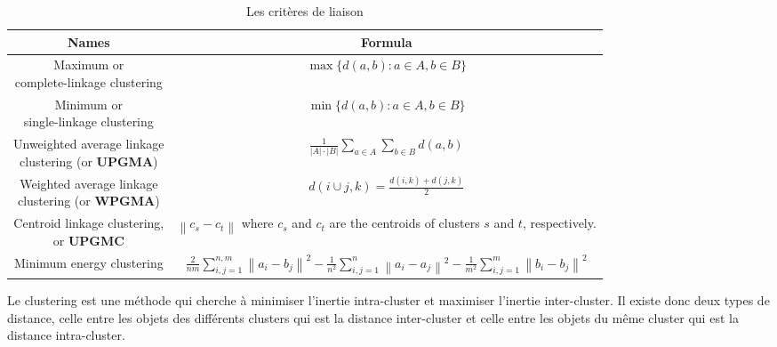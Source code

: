 \begin{table}[!htbp]
    \centering
	\begin{tabular}{|c| c|}
	\hline
	 \textbf{Names} & \textbf{Formula}  \\ \hline
	 \makecell{Maximum or \\ complete-linkage clustering}   & \(\displaystyle \max \{d(a,b): a \in A,b \in B \} \)   \\  \hline
	 \makecell{Minimum or \\ single-linkage clustering}   & \(\displaystyle \min \{d(a,b): a \in A,b \in B \} \)   \\  \hline
	 \makecell{ Unweighted average linkage \\ clustering (or \textbf{UPGMA})} & \(\displaystyle \frac{1}{ \left\lvert A\right\rvert  \cdot \left\lvert B\right\rvert } \sum_{a \in A} \sum_{b \in B} d(a,b)  \)   \\  \hline
	 \makecell{Weighted average linkage \\ clustering (or \textbf{WPGMA})}  & \(\displaystyle d(i \cup j,k) = \frac{d(i,k)+d(j,k)}{2} \)   \\  \hline
	 \makecell{Centroid linkage clustering,\\ or \textbf{UPGMC}}   & \makecell{\(\displaystyle \left\lVert c_{s} - c_{t} \right\rVert \) where \(\displaystyle c_{s} \) and \(\displaystyle c_{t} \)  are the \\ centroids of clusters  \(\displaystyle s \) and \(\displaystyle t \), respectively.}   \\  \hline
	  Minimum energy clustering  & \(\displaystyle \frac{2}{nm}\sum_{i,j=1}^{n,m} \left\lVert
	  a_{i} - b_{j}\right\rVert^{2} - \frac{1}{n^{2}} \sum_{i,j=1}^{n} \left\lVert
	  a_{i} - a_{j}\right\rVert^{2}  - \frac{1}{m^{2}} \sum_{i,j=1}^{m} \left\lVert
	  b_{i} - b_{j}\right\rVert^{2}   \)   \\  \hline
	\end{tabular}
	\caption{Les critères de liaison }
	\label{linkage_criteria}
\end{table}

Le clustering est une méthode qui cherche à minimiser l’inertie intra-cluster et maximiser l’inertie inter-cluster. Il existe donc deux types de distance, celle entre les objets des différents clusters qui est la distance inter-cluster et celle entre les objets du même cluster qui est la distance intra-cluster.

